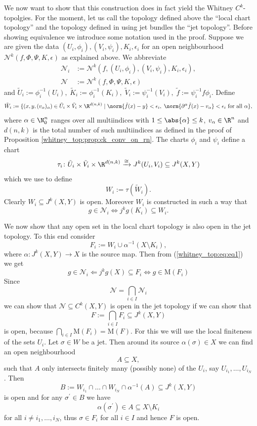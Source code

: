 We now want to show that this construction does in fact yield the Whitney $C^k$-topolgies. For the moment, let us call the topology defined above the ``local chart topology'' and the topology defined in \cite{golubitsky2012stable} using jet bundles the ``jet topology''. Before showing equivalence we introduce some notation used in the proof. Suppose we are given the data $(U_i,\phi_i),(V_i,\psi_i),K_i,\epsilon_i$ for an open neighbourhood $\mathcal{N}^k(f,\Phi,\Psi,K,\epsilon)$ as explained above. We abbreviate 
\begin{align*}
    \mathcal{N}_i &:= \mathcal{N}^k(f,(U_i,\phi_i),(V_i,\psi_i),K_i,\epsilon_i), \\ \mathcal{N} &:= \mathcal{N}^k(f,\Phi,\Psi,K,\epsilon)
\end{align*}
and $ \tilde{U}_i := \phi_i^{-1}(U_i), \;
\tilde{K}_i := \phi_i^{-1}(K_i), \;
\tilde{V}_i := \psi_i^{-1}(V_i), \;
\tilde{f} := \psi_i^{-1} f \phi_i. $
Define
\[
\tilde{W}_i := \{(x,y,(v_\alpha)_{\alpha}) \in 
\tilde{U}_i \times \tilde{V}_i \times \R^{d(n,k)} 
\mid 
\norm{\tilde{f}(x) - y} < \epsilon_i, \;
\norm{\partial^\alpha \tilde{f}(x) - v_\alpha} < \epsilon_i \text{ for all } \alpha
\},
\]
where $\alpha \in \N_0^n$ ranges over all multiindices with $1 \leq \abs{\alpha} \leq k$, $v_\alpha \in \R^n$ and $d(n,k)$ is the total number of such multiindices as defined in the proof of Proposition \ref{whitney_top:prop:ck_conv_on_rn}. The charts $\phi_i$ and $\psi_i$ define a chart 
\[
\tau_i \colon \tilde{U}_i \times \tilde{V}_i \times \R^{d(n,k)} \xrightarrow{\cong} J^k(U_i,V_i) \subseteq J^k(X,Y)
\]
which we use to define 
\[
W_i := \tau(\tilde{W}_i).
\]
Clearly $W_i \subseteq J^k(X,Y)$ is open. Moreover $W_i$ is constructed in such a way that 
\begin{equation}
    \label{whitney_top:eq:eq1}
g \in \mathcal{N}_i \Leftrightarrow j^kg(K_i) \subseteq W_i.
\end{equation}

We now show that any open set in the local chart topology is also open in the jet topology. To this end consider 
\[
F_i := W_i \cup \alpha^{-1}(X \setminus K_i),
\]
where $\alpha \colon J^k(X,Y) \to X$ is the source map. Then from (\ref{whitney_top:eq:eq1}) we get 
\[
g \in \mathcal{N} _i \Leftarrow j^kg(X) \subseteq F_i \Leftrightarrow g \in \mathrm{M}(F_i)
\]
Since 
\[
\mathcal{N} = \bigcap_{i \in I} \mathcal{N} _i
\]
we can show that $\mathcal{N} \subseteq C^k(X,Y)$ is open in the jet topology if we can show that 
\[
F := \bigcap_{i \in I} F_i \subseteq J^k(X,Y)
\] 
is open, because $\bigcap_{i \in I} \mathrm{M}(F_i) = \mathrm{M}(F)$. For this we will use the local finiteness of the sets $U_i$. Let $\sigma \in W$ be a jet. Then around its source $\alpha(\sigma) \in X$ we can find an open neighbourhood
\[
A \subseteq X,
\]
such that $A$ only intersects finitely many (possibly none) of the $U_i$, say $U_{i_1}, \ldots, U_{i_N}$. Then 
\[
B:= W_{i_1} \cap \ldots \cap W_{i_N} \cap \alpha^{-1}(A) \subseteq J^k(X,Y) 
\] 
is open and for any $\sigma^\prime \in B$ we have 
\[
\alpha(\sigma^\prime) \in A \subseteq X \setminus K_i 
\]
for all $i \neq i_1,\ldots,i_N$, thus $\sigma \in F_i$ for all $i \in I$ and hence $F$ is open.

